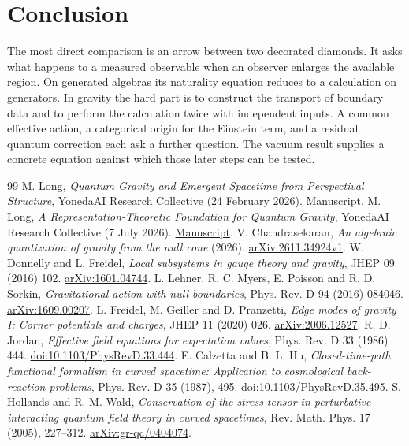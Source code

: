 \documentclass[11pt,letterpaper]{article}
\begin{document}
\section{Conclusion}
The most direct comparison is an arrow between two decorated diamonds. It asks what happens to a measured observable when an observer enlarges the available region. On generated algebras its naturality equation reduces to a calculation on generators. In gravity the hard part is to construct the transport of boundary data and to perform the calculation twice with independent inputs. A common effective action, a categorical origin for the Einstein term, and a residual quantum correction each ask a further question. The vacuum result supplies a concrete equation against which those later steps can be tested.

\begin{thebibliography}{99}
 M. Long, \emph{Quantum Gravity and Emergent Spacetime from Perspectival Structure}, YonedaAI Research Collective (24 February 2026). \href{https://yonedaai.com/papers/pdf/quantum-gravity-emergent-spacetime.pdf}{Manuscript}.
 M. Long, \emph{A Representation-Theoretic Foundation for Quantum Gravity}, YonedaAI Research Collective (7 July 2026). \href{https://yonedaai.com/papers/pdf/library/condensed-representation/part6-condensed-quantum-gravity.pdf}{Manuscript}.
 V. Chandrasekaran, \emph{An algebraic quantization of gravity from the null cone} (2026). \href{https://arxiv.org/abs/2611.34924v1}{arXiv:2611.34924v1}.
 W. Donnelly and L. Freidel, \emph{Local subsystems in gauge theory and gravity}, JHEP 09 (2016) 102. \href{https://arxiv.org/abs/1601.04744}{arXiv:1601.04744}.
 L. Lehner, R. C. Myers, E. Poisson and R. D. Sorkin, \emph{Gravitational action with null boundaries}, Phys. Rev. D 94 (2016) 084046. \href{https://arxiv.org/abs/1609.00207}{arXiv:1609.00207}.
 L. Freidel, M. Geiller and D. Pranzetti, \emph{Edge modes of gravity I: Corner potentials and charges}, JHEP 11 (2020) 026. \href{https://arxiv.org/abs/2006.12527}{arXiv:2006.12527}.
 R. D. Jordan, \emph{Effective field equations for expectation values}, Phys. Rev. D 33 (1986) 444. \href{https://doi.org/10.1103/PhysRevD.33.444}{doi:10.1103/PhysRevD.33.444}.
 E. Calzetta and B. L. Hu, \emph{Closed-time-path functional formalism in curved spacetime: Application to cosmological back-reaction problems}, Phys. Rev. D 35 (1987), 495. \href{https://doi.org/10.1103/PhysRevD.35.495}{doi:10.1103/PhysRevD.35.495}.
 S. Hollands and R. M. Wald, \emph{Conservation of the stress tensor in perturbative interacting quantum field theory in curved spacetimes}, Rev. Math. Phys. 17 (2005), 227--312. \href{https://arxiv.org/abs/gr-qc/0404074}{arXiv:gr-qc/0404074}.
\end{thebibliography}
\end{document}
